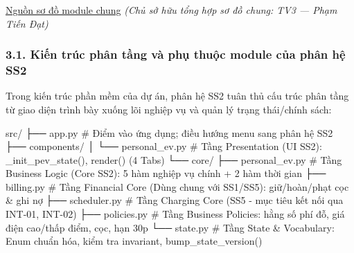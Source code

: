 \documentclass[11pt,a4paper]{article}
\newenvironment{Shaded}{}{}
\newcommand{\NormalTok}[1]{#1}
\begin{document}
\href{../../../diagrams/submission_3/shared/implementation.puml}{Nguồn
sơ đồ module chung} \emph{(Chủ sở hữu tổng hợp sơ đồ chung: TV3 --- Phạm
Tiến Đạt)}

\hypertarget{kiux1ebfn-truxfac-phuxe2n-tux1ea7ng-vuxe0-phux1ee5-thuux1ed9c-module-cux1ee7a-phuxe2n-hux1ec7-ss2}{%
\subsubsection{3.1. Kiến trúc phân tầng và phụ thuộc module của phân hệ
SS2}\label{kiux1ebfn-truxfac-phuxe2n-tux1ea7ng-vuxe0-phux1ee5-thuux1ed9c-module-cux1ee7a-phuxe2n-hux1ec7-ss2}}

Trong kiến trúc phần mềm của dự án, phân hệ SS2 tuân thủ cấu trúc phân
tầng từ giao diện trình bày xuống lõi nghiệp vụ và quản lý trạng
thái/chính sách:

\begin{Shaded}
\begin{Highlighting}[]
\NormalTok{src/}
\NormalTok{├── app.py                              \# Điểm vào ứng dụng; điều hướng menu sang phân hệ SS2}
\NormalTok{├── components/}
\NormalTok{│   └── personal\_ev.py                  \# Tầng Presentation (UI SS2): \_init\_pev\_state(), render() (4 Tabs)}
\NormalTok{└── core/}
\NormalTok{    ├── personal\_ev.py                  \# Tầng Business Logic (Core SS2): 5 hàm nghiệp vụ chính + 2 hàm thời gian}
\NormalTok{    ├── billing.py                      \# Tầng Financial Core (Dùng chung với SS1/SS5): giữ/hoàn/phạt cọc \& ghi nợ}
\NormalTok{    ├── scheduler.py                    \# Tầng Charging Core (SS5 {-} mục tiêu kết nối qua INT{-}01, INT{-}02)}
\NormalTok{    ├── policies.py                     \# Tầng Business Policies: hằng số phí đỗ, giá điện cao/thấp điểm, cọc, hạn 30p}
\NormalTok{    └── state.py                        \# Tầng State \& Vocabulary: Enum chuẩn hóa, kiểm tra invariant, bump\_state\_version()}
\end{Highlighting}
\end{Shaded}
\end{document}
